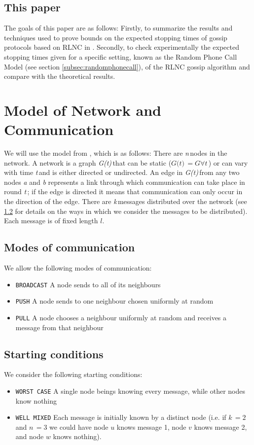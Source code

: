\documentclass{article} %
\def\numNodes{\textit{n}\,}
\def\graph{\textit{G(t)}\,}
\def\graphtime{\textit{t}\,}
\def\numMessages{\textit{k}\,}
\begin{document}
\subsection{This paper}
The goals of this paper are as follows: Firstly, to summarize the results and techniques used to prove bounds on the expected stopping times of gossip protocols based on RLNC in \cite{haeupler2011analyzing}. Secondly, to check experimentally the expected stopping times given for a specific setting, known as the Random Phone Call Model (see section \ref{subsec:randomphonecall}), of the RLNC gossip algorithm and compare with the theoretical results. 

\section{Model of Network and Communication}
We will use the model from \cite{haeupler2011analyzing}, which is as follows: There are \numNodes nodes in the network. A network is a graph \graph that can be static ($\graph = G  \forall \graphtime$) or can vary with time \graphtime and is either directed or undirected. An edge in \graph from any two nodes \textit{a} and \textit{b} represents a link through which communication can take place in round \graphtime; if the edge is directed it means that communication can only occur in the direction of the edge. There are \numMessages messages distributed over the network (see \ref{subsec:startingconditions} for details on the ways in which we consider the messages to be distributed). Each message is of fixed length $l$.

\subsection{Modes of communication}\label{subsec:communication}
We allow the following modes of communication:
\begin{itemize}
	\item \texttt{BROADCAST} A node sends to all of its neighbours
	\item \texttt{PUSH} A node sends to one neighbour chosen uniformly at random
	\item \texttt{PULL} A node chooses a neighbour uniformly at random and receives a message from that neighbour
\end{itemize}

\subsection{Starting conditions}\label{subsec:startingconditions}
We consider the following starting conditions:
\begin{itemize}
	\item \texttt{WORST CASE} A single node beings knowing every message, while other nodes know nothing
	\item \texttt{WELL MIXED} Each message is initially known by a distinct node (i.e. if $\numMessages=2$ and $\numNodes=3$ we could have node $u$ knows message 1, node $v$ knows message 2, and node $w$ knows nothing).
\end{itemize}
\end{document}
